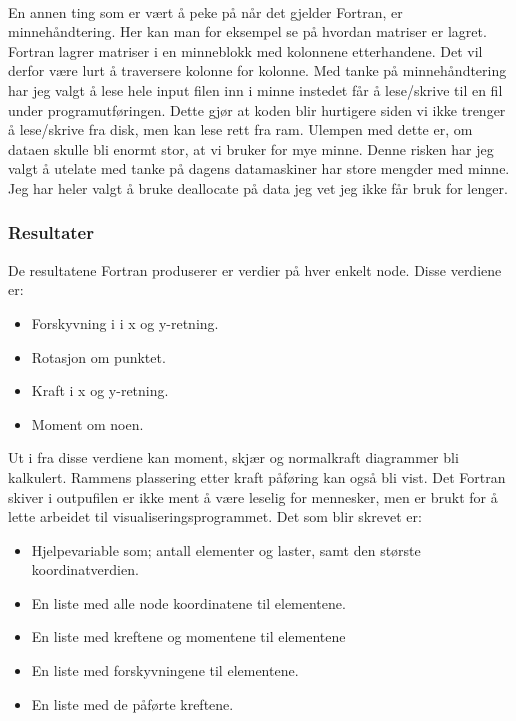 \documentclass[10pt,a4paper, norsk]{article}
\begin{document}
\paragraph*{}
En annen ting som er vært å peke på når det gjelder Fortran, er minnehåndtering. Her kan man for eksempel se på hvordan matriser er lagret. Fortran lagrer matriser i en minneblokk med kolonnene etterhandene. Det vil derfor være lurt å traversere kolonne for kolonne.
 Med tanke på minnehåndtering har jeg valgt å lese hele input filen inn i minne instedet får å lese/skrive til en fil under programutføringen. Dette gjør at koden blir hurtigere siden vi ikke trenger å lese/skrive fra disk, men kan lese rett fra ram. Ulempen med dette er, om dataen skulle bli enormt stor, at vi bruker for mye minne. Denne risken har jeg valgt å utelate med tanke på dagens datamaskiner har store mengder med minne. Jeg har heler valgt å bruke deallocate på data jeg vet jeg ikke får bruk for lenger.



\subsubsection{Resultater}
De resultatene Fortran produserer er verdier på hver enkelt node. Disse verdiene er:

\begin{itemize}
\item Forskyvning i i x og y-retning.
\item Rotasjon om punktet.
\item Kraft i x og y-retning.
\item Moment om noen. 
\end{itemize}

Ut i fra disse verdiene kan moment, skjær og normalkraft diagrammer bli kalkulert. Rammens plassering etter kraft påføring kan også bli vist. Det Fortran skiver i outpufilen er ikke ment å være leselig for mennesker, men er brukt for å lette arbeidet til visualiseringsprogrammet. Det som blir skrevet er:


\begin{itemize}
\item Hjelpevariable som; antall elementer og laster, samt den største koordinatverdien.
\item En liste med alle node koordinatene til elementene.
\item En liste med kreftene og momentene til elementene
\item En liste med forskyvningene til elementene.
\item En liste med de påførte kreftene.
\end{itemize}
\end{document}

